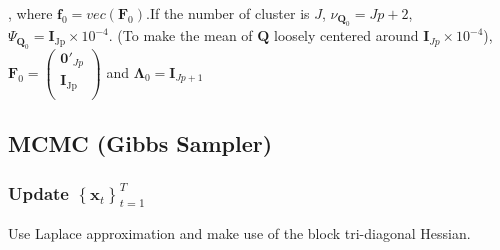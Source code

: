 \documentclass[]{article}
\begin{document}
\begin{enumerate}
	, where \(\mathbf{f}_0 = vec(\mathbf{F}_0)\).If the number of cluster is \(J\), \(\nu_{\mathbf{Q}_{0}} = Jp + 2\),
	\(\Psi_{\mathbf{Q}_{0}} = \mathbf{I}_{\text{Jp}} \times 10^{- 4}\). (To make the mean of \(\mathbf{Q}\) loosely centered around
	\(\mathbf{I}_{Jp} \times 10^{- 4}\)), \(\mathbf{F}_0 = \begin{pmatrix}
		\mathbf{0}'_{Jp} \\
		\mathbf{I}_{\text{Jp}} \\
	\end{pmatrix}\) and \(\bm{\Lambda}_0 = \mathbf{I}_{Jp + 1}\)
	
\end{enumerate}

\subsection{MCMC (Gibbs Sampler)}

\subsubsection{Update \(\left\{ \mathbf{x}_{t} \right\}_{t=1}^T\)}
Use Laplace approximation and make use of the block tri-diagonal Hessian.
\end{document}
